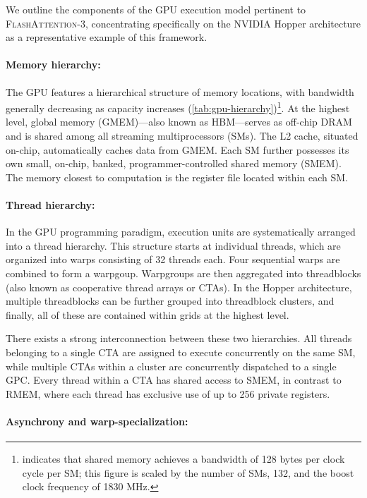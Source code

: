 We outline the components of the GPU execution model pertinent to \textsc{FlashAttention-3}, concentrating specifically on the NVIDIA Hopper architecture as a representative example of this framework.

\paragraph{Memory hierarchy:} The GPU features a hierarchical structure of memory locations, with bandwidth generally decreasing as capacity increases (\cref{tab:gpu-hierarchy})\footnote{\citet{luo2024benchmarking} indicates that shared memory achieves a bandwidth of 128 bytes per clock cycle per SM; this figure is scaled by the number of SMs, 132, and the boost clock frequency of 1830 MHz.}. At the highest level, global memory (GMEM)—also known as HBM—serves as off-chip DRAM and is shared among all streaming multiprocessors (SMs). The L2 cache, situated on-chip, automatically caches data from GMEM. Each SM further possesses its own small, on-chip, banked, programmer-controlled shared memory (SMEM). The memory closest to computation is the register file located within each SM.

\paragraph{Thread hierarchy:} In the GPU programming paradigm, execution units are systematically arranged into a thread hierarchy. This structure starts at individual threads, which are organized into warps consisting of 32 threads each. Four sequential warps are combined to form a warpgoup. Warpgroups are then aggregated into threadblocks (also known as cooperative thread arrays or CTAs). In the Hopper architecture, multiple threadblocks can be further grouped into threadblock clusters, and finally, all of these are contained within grids at the highest level.

There exists a strong interconnection between these two hierarchies. All threads belonging to a single CTA are assigned to execute concurrently on the same SM, while multiple CTAs within a cluster are concurrently dispatched to a single GPC. Every thread within a CTA has shared access to SMEM, in contrast to RMEM, where each thread has exclusive use of up to 256 private registers.

\paragraph{Asynchrony and warp-specialization:}

